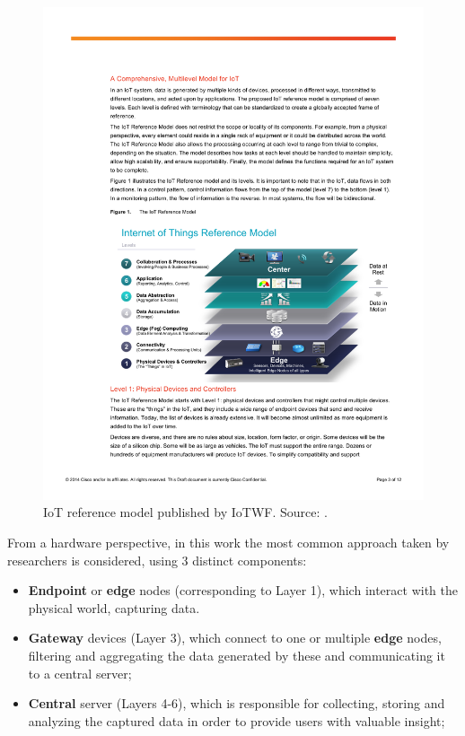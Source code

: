 \begin{figure}[H]
    \centering
    \includegraphics[width=\linewidth]{images/IoT_Reference_Model.pdf}
    \caption[IoT reference model published by IoTWF.]{IoT reference model published by IoTWF. Source: \cite{Cisco2014}.}
    \label{fig:iotwf-referencemodel}
\end{figure}

From a hardware perspective, in this work the most common approach taken by researchers is considered, using 3 distinct components: 

\begin{itemize}
    \item \textbf{Endpoint} or \textbf{edge} nodes (corresponding to Layer 1), which interact with the physical world, capturing data.
    \item \textbf{Gateway} devices (Layer 3), which connect to one or multiple \textbf{edge} nodes, filtering and aggregating the data generated by these and communicating it to a central server; 
    \item \textbf{Central} server (Layers 4-6), which is responsible for collecting, storing and analyzing the captured data in order to provide users with valuable insight;
\end{itemize}


